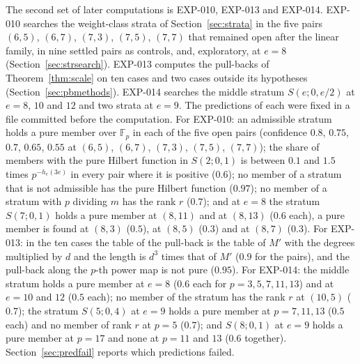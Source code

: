 \documentclass[11pt]{article}
\theoremstyle{definition}
\theoremstyle{remark}
\newcommand{\EXP}[1]{\mbox{EXP-#1}}
\newcommand{\F}{\mathbb{F}}
\begin{document}
The second set of later computations is \EXP{010}, \EXP{013} and \EXP{014}. \EXP{010} searches the weight-class strata of Section~\ref{sec:strata} in the five pairs $(6,5)$, $(6,7)$, $(7,3)$, $(7,5)$, $(7,7)$ that remained open after the linear family, in nine settled pairs as controls, and, exploratory, at $e=8$ (Section~\ref{sec:strsearch}). \EXP{013} computes the pull-backs of Theorem~\ref{thm:scale} on ten cases and two cases outside its hypotheses (Section~\ref{sec:pbmethods}). \EXP{014} searches the middle stratum $S(e;0,e/2)$ at $e=8$, $10$ and $12$ and two strata at $e=9$. The predictions of each were fixed in a file committed before the computation. For \EXP{010}: an admissible stratum holds a pure member over $\F_p$ in each of the five open pairs (confidence $0.8$, $0.75$, $0.7$, $0.65$, $0.55$ at $(6,5)$, $(6,7)$, $(7,3)$, $(7,5)$, $(7,7)$); the share of members with the pure Hilbert function in $S(2;0,1)$ is between $0.1$ and $1.5$ times $p^{-h_e(3e)}$ in every pair where it is positive ($0.6$); no member of a stratum that is not admissible has the pure Hilbert function ($0.97$); no member of a stratum with $p$ dividing $m$ has the rank $r$ ($0.7$); and at $e=8$ the stratum $S(7;0,1)$ holds a pure member at $(8,11)$ and at $(8,13)$ ($0.6$ each), a pure member is found at $(8,3)$ ($0.5$), at $(8,5)$ ($0.3$) and at $(8,7)$ ($0.3$). For \EXP{013}: in the ten cases the table of the pull-back is the table of $M'$ with the degrees multiplied by $d$ and the length is $d^3$ times that of $M'$ ($0.9$ for the pairs), and the pull-back along the $p$-th power map is not pure ($0.95$). For \EXP{014}: the middle stratum holds a pure member at $e=8$ ($0.6$ each for $p=3,5,7,11,13$) and at $e=10$ and $12$ ($0.5$ each); no member of the stratum has the rank $r$ at $(10,5)$ ($0.7$); the stratum $S(5;0,4)$ at $e=9$ holds a pure member at $p=7,11,13$ ($0.5$ each) and no member of rank $r$ at $p=5$ ($0.7$); and $S(8;0,1)$ at $e=9$ holds a pure member at $p=17$ and none at $p=11$ and $13$ ($0.6$ together). Section~\ref{sec:predfail} reports which predictions failed.
\end{document}
